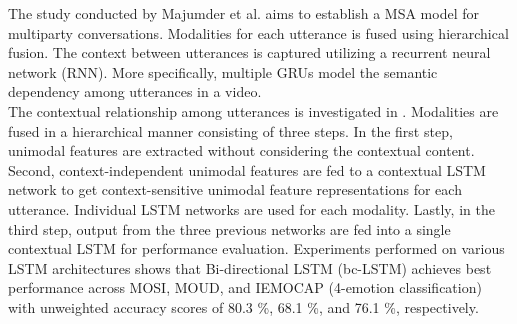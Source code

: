 The study conducted by Majumder et al. \cite{DialogueRNN_MAJUMDER2018124} aims to establish a MSA model for multiparty conversations. Modalities for each utterance is fused using hierarchical fusion. The context between utterances is captured utilizing a recurrent neural network (RNN). More specifically, multiple GRUs model the semantic dependency among utterances in a video. \\

The contextual relationship among utterances is investigated in \cite{bc-LSTM_poria2017context}. Modalities are fused in a hierarchical manner consisting of three steps. In the first step, unimodal features are extracted without considering the contextual content. Second, context-independent  unimodal features are fed to a contextual LSTM network to get context-sensitive unimodal feature representations for each utterance. Individual LSTM networks are used for each modality. Lastly, in the third step, output from the three previous networks are fed into a single contextual LSTM for performance evaluation. Experiments performed on various LSTM architectures shows that Bi-directional LSTM (bc-LSTM) achieves best performance across MOSI, MOUD, and IEMOCAP (4-emotion classification) with unweighted accuracy scores of 80.3 \%, 68.1 \%, and 76.1 \%, respectively. \\

